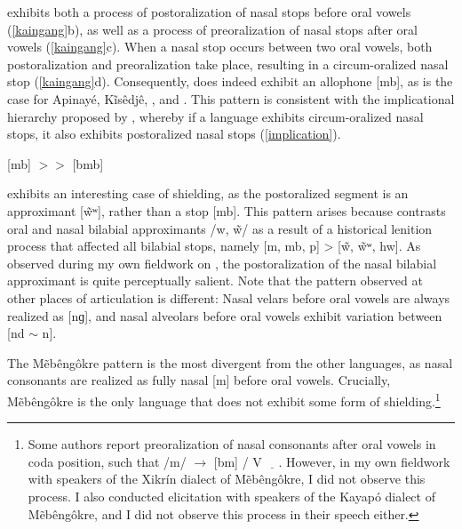 \documentclass[output=paper,hidelinks]{langscibook}
\begin{document}
 exhibits both a process of postoralization of nasal stops before oral vowels (\ref{kaingang}b), as well as a process of preoralization of nasal stops after oral vowels (\ref{kaingang}c). When a nasal stop occurs between two oral vowels, both postoralization and preoralization take place, resulting in a circum-oralized nasal stop (\ref{kaingang}d). Consequently,  does indeed exhibit an allophone [mb], as is the case for Apinay\'e, K\~is\^edj\^e, , and . This pattern is consistent with the implicational hierarchy proposed by \citet{stanton2017}, whereby if a language exhibits circum-oralized nasal stops, it also exhibits postoralized nasal stops (\ref{implication}).

\ea\label{implication} [mb] $>>$ [bmb]
\z

 exhibits an interesting case of shielding, as the postoralized segment is an approximant [\~wʷ], rather than a stop [mb]. This pattern arises because  contrasts oral and nasal bilabial approximants /w, \~w/ \citep{Beauchamp2019} as a result of a historical lenition process that affected all bilabial stops, namely [m, mb, p] > [\~w, \~wʷ, hw]. As observed during my own fieldwork on , the postoralization of the nasal bilabial approximant is quite perceptually salient. Note that the pattern observed at other places of articulation is different: Nasal velars before oral vowels are always realized as [nɡ], and nasal alveolars before oral vowels exhibit variation between [nd $\sim$ n].

The M\~eb\^eng\^okre pattern is the most divergent from the other  languages, as nasal consonants are realized as fully nasal [m] before oral vowels. Crucially, M\~eb\^eng\^okre is the only language that does not exhibit some form of shielding.\footnote{Some authors \citep{StoutThomson1974, SalanovaReisSilva2011} report preoralization of nasal consonants after oral vowels in coda position, such that /m/ $\rightarrow$ [bm] /  V $\underline{\hspace{1em}}$. However, in my own fieldwork with speakers of the Xikr\'in dialect of M\~eb\^eng\^okre, I did not observe this process. I also conducted elicitation with speakers of the Kayap\'o dialect of M\~eb\^eng\^okre, and I did not observe this process in their speech either.}
\end{document}
